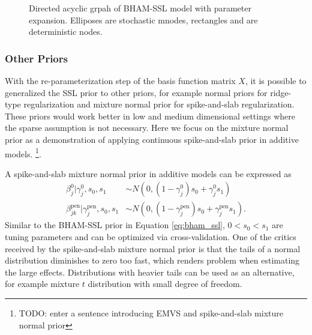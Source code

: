 \documentclass[AMA,STIX1COL,]{WileyNJD-v2}
\begin{document}
\begin{figure}

\caption{Directed acyclic grpah of BHAM-SSL model with parameter expansion. Elliposes are stochastic mnodes, rectangles and are deterministic nodes. }
\label{fig:SSprior}
\end{figure}

\hypertarget{other-priors}{%
\subsubsection{Other Priors}\label{other-priors}}

With the re-parameterization step of the basis function matrix \(X\), it
is possible to generalized the SSL prior to other priors, for example
normal priors for ridge-type regularization and mixture normal prior for
spike-and-slab regularization. These priors would work better in low and
medium dimensional settings where the sparse assumption is not
necessary. Here we focus on the mixture normal prior as a demonstration
of applying continuous spike-and-slab prior in additive models.
\footnote{TODO: enter a sentence introducing EMVS and spike-and-slab
  mixture normal prior}.

A spike-and-slab mixture normal prior in additive models can be
expressed as \[
\begin{aligned}
  \beta^0_{j} |\gamma^0_{j},s_0,s_1 &\sim N(0,(1-\gamma^0_{j}) s_0 + \gamma^0_{j} s_1)\nonumber\\
  \beta^\text{pen}_{jk} | \gamma^\text{pen}_{j},s_0,s_1 &\sim N(0,(1-\gamma^\text{pen}_{j}) s_0 + \gamma^\text{pen}_{j} s_1).
\end{aligned}
\] Similar to the BHAM-SSL prior in Equation \ref{eq:bham_ssl},
\(0 < s_0 < s_1\) are tuning parameters and can be optimized via
cross-validation. One of the critics received by the spike-and-slab
mixture normal prior is that the tails of a normal distribution
diminishes to zero too fast, which renders problem when estimating the
large effects. Distributions with heavier tails can be used as an
alternative, for example mixture \(t\) distribution with small degree of
freedom.
\end{document}
